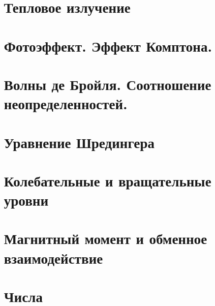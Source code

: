 % 


\section{Тепловое излучение}


\section{Фотоэффект. Эффект Комптона.}


\section{Волны де Бройля. Соотношение неопределенностей.}


\section{Уравнение Шредингера}

\section{Колебательные и вращательные уровни}
 


\section{Магнитный момент и обменное взаимодействие}
 


\section{Числа}





% 
